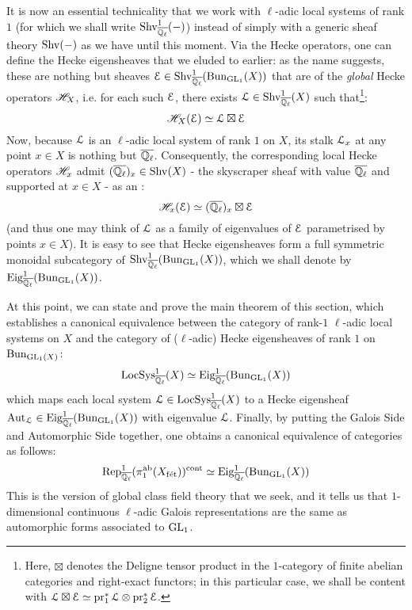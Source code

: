             It is now an essential technicality that we work with $\ell$-adic local systems of rank $1$ (for which we shall write $\mathrm{Shv}_{\overline{\mathbb{Q}_{\ell}}}^1(-)$) instead of simply with a generic sheaf theory $\mathrm{Shv}(-)$ as we have until this moment. Via the Hecke operators, one can define the Hecke eigensheaves that we eluded to earlier: as the name suggests, these are nothing but sheaves $\mathcal{E} \in \mathrm{Shv}_{\overline{\mathbb{Q}_{\ell}}}^1(\mathrm{Bun}_{\operatorname{GL}_1}(X))$ that are  of the \textit{global} Hecke operators $\mathscr{H}_X$, i.e. for each such $\mathcal{E}$, there exists $\mathcal{L} \in \mathrm{Shv}_{\overline{\mathbb{Q}_{\ell}}}^1(X)$ such that\footnote{Here, $\boxtimes$ denotes the Deligne tensor product in the $1$-category of finite abelian categories and right-exact functors; in this particular case, we shall be content with $\calL \boxtimes \E \cong \pr_1^*\calL \tensor \pr_2^*\E$.}:
                $$\mathscr{H}_X(\mathcal{E}) \simeq \mathcal{L} \boxtimes \mathcal{E}$$
            Now, because $\mathcal{L}$ is an $\ell$-adic local system of rank $1$ on $X$, its stalk $\mathcal{L}_x$ at any point $x \in X$ is nothing but $\overline{\mathbb{Q}_{\ell}}$. Consequently, the corresponding local Hecke operators $\mathscr{H}_x$ admit $(\overline{\mathbb{Q}_{\ell}})_x \in \mathrm{Shv}(X)$ - the skyscraper sheaf with value $\overline{\mathbb{Q}_{\ell}}$ and supported at $x \in X$ - as an :
                $$\mathscr{H}_x(\mathcal{E}) \simeq (\overline{\mathbb{Q}_{\ell}})_x \boxtimes \mathcal{E}$$
            (and thus one may think of $\mathcal{L}$ as a family of eigenvalues of $\mathcal{E}$ parametrised by points $x \in X$). It is easy to see that Hecke eigensheaves form a full symmetric monoidal subcategory of $\mathrm{Shv}_{\overline{\mathbb{Q}_{\ell}}}^1(\mathrm{Bun}_{\operatorname{GL}_1}(X))$, which we shall denote by $\mathrm{Eig}^1_{\overline{\mathbb{Q}_{\ell}}}(\mathrm{Bun}_{\operatorname{GL}_1}(X))$. 
            
            At this point, we can state and prove the main theorem of this section, which establishes a canonical equivalence between the category of rank-$1$ $\ell$-adic local systems on $X$ and the category of ($\ell$-adic) Hecke eigensheaves of rank $1$ on $\mathrm{Bun}_{\operatorname{GL}_1(X)}$:
                $$\mathrm{LocSys}_{\overline{\mathbb{Q}_{\ell}}}^1(X) \simeq \mathrm{Eig}^1_{\overline{\mathbb{Q}_{\ell}}}(\mathrm{Bun}_{\operatorname{GL}_1}(X))$$
            which maps each local system $\mathcal{L} \in \mathrm{LocSys}_{\overline{\mathbb{Q}_{\ell}}}^1(X)$ to a Hecke eigensheaf $\mathrm{Aut}_{\mathcal{L}} \in \mathrm{Eig}^1_{\overline{\mathbb{Q}_{\ell}}}(\mathrm{Bun}_{\operatorname{GL}_1}(X))$ with eigenvalue $\mathcal{L}$. Finally, by putting the Galois Side and Automorphic Side together, one obtains a canonical equivalence of categories as follows:
                $$\mathrm{Rep}_{\overline{\mathbb{Q}_{\ell}}}^1(\pi_1^{\mathrm{ab}}(X_{\mathrm{f\acute{e}t}}))^{\mathrm{cont}} \simeq \mathrm{Eig}^1_{\overline{\mathbb{Q}_{\ell}}}(\mathrm{Bun}_{\operatorname{GL}_1}(X))$$
            This is the version of global class field theory that we seek, and it tells us that $1$-dimensional continuous $\ell$-adic Galois representations are the same as automorphic forms associated to $\operatorname{GL}_1$.
	    
